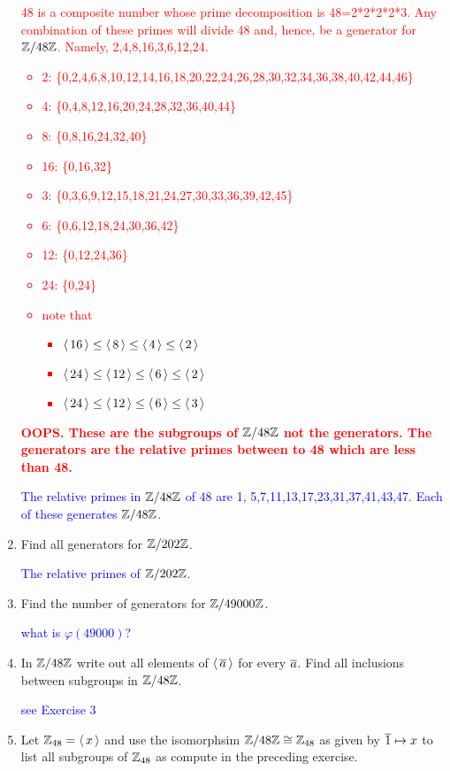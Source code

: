 \documentclass[10pt,a4paper]{report}
\newcommand{\RED}[1]{\textcolor{red}{#1}}
\newcommand{\BLUE}[1]{\textcolor{blue}{#1}}
\begin{document}
\begin{enumerate}
	\RED{48 is a composite number whose prime decomposition is 48=2*2*2*2*3.  Any combination of these primes will divide 48 and, hence, be a generator for $\mathbb{Z}/48\mathbb{Z}$.  Namely, 2,4,8,16,3,6,12,24.
	\begin{itemize}
		\item 2: \{0,2,4,6,8,10,12,14,16,18,20,22,24,26,28,30,32,34,36,38,40,42,44,46\}
		\item 4: \{0,4,8,12,16,20,24,28,32,36,40,44\}
		\item 8: \{0,8,16,24,32,40\}
		\item 16: \{0,16,32\}
		\item 3: \{0,3,6,9,12,15,18,21,24,27,30,33,36,39,42,45\}
		\item 6: \{0,6,12,18,24,30,36,42\}
		\item 12: \{0,12,24,36\}
		\item 24: \{0,24\}
		\item note that
		\begin{itemize}
			\item $\left \langle\, 16 \,\right \rangle\le\left \langle\, 8 \,\right \rangle\le\left \langle\, 4 \,\right \rangle\le\left \langle\, 2 \,\right \rangle$
			\item $\left \langle\, 24 \,\right \rangle\le\left \langle\, 12 \,\right \rangle\le\left \langle\, 6 \,\right \rangle\le\left \langle\, 2 \,\right \rangle$
			\item $\left \langle\, 24 \,\right \rangle\le\left \langle\, 12 \,\right \rangle\le\left \langle\, 6 \,\right \rangle\le\left \langle\, 3 \,\right \rangle$
		\end{itemize}
	\end{itemize}\textbf{OOPS.  These are the subgroups of $\mathbb{Z}/48\mathbb{Z}$ not the generators.  The generators are the relative primes between to 48 which are less than 48.}\\
	}\BLUE{The relative primes in $\mathbb{Z}/48\mathbb{Z}$ of 48 are 1, 5,7,11,13,17,23,31,37,41,43,47.  Each of these generates $\mathbb{Z}/48\mathbb{Z}$.
	}
	
	\item Find all generators for $\mathbb{Z}/202\mathbb{Z}$.
	
	\BLUE{The relative primes of $\mathbb{Z}/202\mathbb{Z}$.
	}
	
	\item Find the number of generators for $\mathbb{Z}/49000\mathbb{Z}$.
	
	\BLUE{what is $\varphi(49000)$?
	}
	
	\item In $\mathbb{Z}/48\mathbb{Z}$ write out all elements of $\left \langle\, \overline{a} \,\right \rangle$ for every $\overline{a}$.  Find all inclusions between subgroups in $\mathbb{Z}/48\mathbb{Z}$.
	
	\BLUE{see Exercise 3}
	
	\item Let $\mathbb{Z}_{48}=\left \langle\, x \,\right \rangle$ and use the isomorphsim $\mathbb{Z}/48\mathbb{Z} \cong \mathbb{Z}_{48}$ as given by $\overline{1} \mapsto x$ to list all subgroups of $\mathbb{Z}_{48}$ as compute in the preceding exercise.
	

\end{enumerate}
\end{document}
